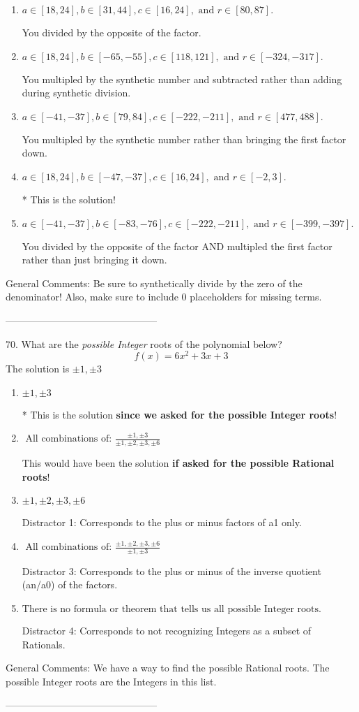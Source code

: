 \documentclass{extbook}[14pt]
\begin{document}
\begin{enumerate}[label=\Alph*.] 
\item $ a \in [18, 24], b \in [31, 44], c \in [16, 24], \text{ and } r \in [80, 87]. $ 

  You divided by the opposite of the factor. 
\item $ a \in [18, 24], b \in [-65, -55], c \in [118, 121], \text{ and } r \in [-324, -317]. $ 

  You multipled by the synthetic number and subtracted rather than adding during synthetic division. 
\item $ a \in [-41, -37], b \in [79, 84], c \in [-222, -211], \text{ and } r \in [477, 488]. $ 

  You multipled by the synthetic number rather than bringing the first factor down. 
\item $ a \in [18, 24], b \in [-47, -37], c \in [16, 24], \text{ and } r \in [-2, 3]. $ 

 * This is the solution! 
\item $ a \in [-41, -37], b \in [-83, -76], c \in [-222, -211], \text{ and } r \in [-399, -397]. $ 

  You divided by the opposite of the factor AND multipled the first factor rather than just bringing it down. 
\end{enumerate} 
 
General Comments: Be sure to synthetically divide by the zero of the denominator! Also, make sure to include 0 placeholders for missing terms.

-----------------------------------------------

70. What are the \textit{possible Integer} roots of the polynomial below?
\[ f(x) = 6x^{2} +3 x + 3 \] 
The solution is $ \pm 1,\pm 3 $ 

\begin{enumerate}[label=\Alph*.] 
\item $ \pm 1,\pm 3 $ 

 * This is the solution \textbf{since we asked for the possible Integer roots}! 
\item $ \text{ All combinations of: }\frac{\pm 1,\pm 3}{\pm 1,\pm 2,\pm 3,\pm 6} $ 

 This would have been the solution \textbf{if asked for the possible Rational roots}! 
\item $ \pm 1,\pm 2,\pm 3,\pm 6 $ 

  Distractor 1: Corresponds to the plus or minus factors of a1 only. 
\item $ \text{ All combinations of: }\frac{\pm 1,\pm 2,\pm 3,\pm 6}{\pm 1,\pm 3} $ 

  Distractor 3: Corresponds to the plus or minus of the inverse quotient (an/a0) of the factors.  
\item $ \text{There is no formula or theorem that tells us all possible Integer roots.} $ 

  Distractor 4: Corresponds to not recognizing Integers as a subset of Rationals. 
\end{enumerate} 
 
General Comments: We have a way to find the possible Rational roots. The possible Integer roots are the Integers in this list.

-----------------------------------------------
\end{document}
